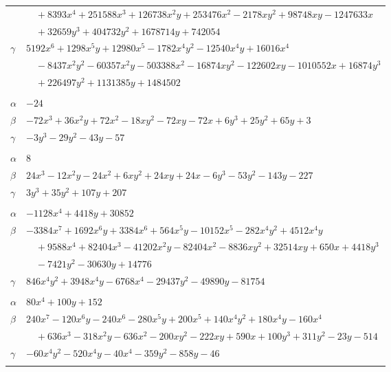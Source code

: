 \documentclass[11pt]{article}
\begin{document}
\begin{longtable}{@{}ll@{}}
 & $\quad +8393x^{4}+251588x^{3}+126738x^{2}y+253476x^{2}-2178xy^{2}+98748xy-1247633x$\\
 & $\quad +32659y^{3}+404732y^{2}+1678714y+742054$\\
$\gamma$ & $5192x^{6}+1298x^{5}y+12980x^{5}-1782x^{4}y^{2}-12540x^{4}y+16016x^{4}$\\
 & $\quad -8437x^{2}y^{2}-60357x^{2}y-503388x^{2}-16874xy^{2}-122602xy-1010552x+16874y^{3}$\\
 & $\quad +226497y^{2}+1131385y+1484502$\\
\addlinespace[3pt]
\multicolumn{2}{@{}l}{$\{i,j\}=\{11,16\}$, $k_{ij}=3^{3}$}\\
$\alpha$ & $-24$\\
$\beta$ & $-72x^{3}+36x^{2}y+72x^{2}-18xy^{2}-72xy-72x+6y^{3}+25y^{2}+65y+3$\\
$\gamma$ & $-3y^{3}-29y^{2}-43y-57$\\
\addlinespace[3pt]
\multicolumn{2}{@{}l}{$\{i,j\}=\{11,18\}$, $k_{ij}=3\cdot 5\cdot 17$}\\
$\alpha$ & $8$\\
$\beta$ & $24x^{3}-12x^{2}y-24x^{2}+6xy^{2}+24xy+24x-6y^{3}-53y^{2}-143y-227$\\
$\gamma$ & $3y^{3}+35y^{2}+107y+207$\\
\addlinespace[3pt]
\multicolumn{2}{@{}l}{$\{i,j\}=\{11,26\}$, $k_{ij}=2^{2}\cdot 5^{2}\cdot 13$}\\
$\alpha$ & $-1128x^{4}+4418y+30852$\\
$\beta$ & $-3384x^{7}+1692x^{6}y+3384x^{6}+564x^{5}y-10152x^{5}-282x^{4}y^{2}+4512x^{4}y$\\
 & $\quad +9588x^{4}+82404x^{3}-41202x^{2}y-82404x^{2}-8836xy^{2}+32514xy+650x+4418y^{3}$\\
 & $\quad -7421y^{2}-30630y+14776$\\
$\gamma$ & $846x^{4}y^{2}+3948x^{4}y-6768x^{4}-29437y^{2}-49890y-81754$\\
\addlinespace[3pt]
\multicolumn{2}{@{}l}{$\{i,j\}=\{11,27\}$, $k_{ij}=2\cdot 3^{4}\cdot 7$}\\
$\alpha$ & $80x^{4}+100y+152$\\
$\beta$ & $240x^{7}-120x^{6}y-240x^{6}-280x^{5}y+200x^{5}+140x^{4}y^{2}+180x^{4}y-160x^{4}$\\
 & $\quad +636x^{3}-318x^{2}y-636x^{2}-200xy^{2}-222xy+590x+100y^{3}+311y^{2}-23y-514$\\
$\gamma$ & $-60x^{4}y^{2}-520x^{4}y-40x^{4}-359y^{2}-858y-46$\\
\addlinespace[3pt]
\multicolumn{2}{@{}l}{$\{i,j\}=\{11,31\}$, $k_{ij}=2\cdot 3\cdot 13$}\\

\end{longtable}
\end{document}
